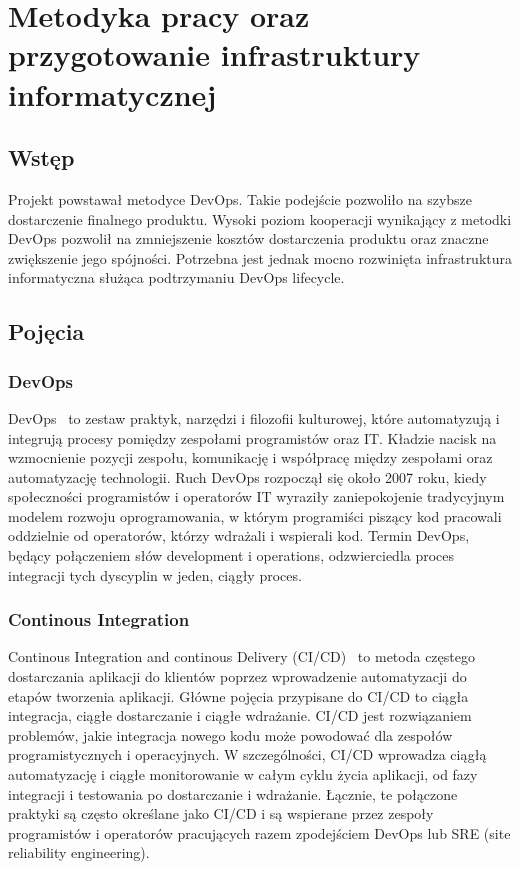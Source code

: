 
\chapter{Metodyka pracy oraz przygotowanie infrastruktury informatycznej}

\section{Wstęp}
Projekt powstawał metodyce DevOps. Takie podejście pozwoliło na szybsze dostarczenie finalnego produktu. Wysoki poziom kooperacji wynikający z metodki DevOps pozwolił na zmniejszenie kosztów dostarczenia produktu oraz znaczne zwiększenie jego spójności. Potrzebna jest jednak mocno rozwinięta infrastruktura informatyczna służąca podtrzymaniu DevOps lifecycle.

\section{Pojęcia}
	\subsection{DevOps}
	DevOps~\cite{devops} to zestaw praktyk, narzędzi i filozofii kulturowej, które automatyzują i integrują procesy pomiędzy zespołami programistów oraz IT. Kładzie nacisk na wzmocnienie pozycji zespołu, komunikację i współpracę między zespołami oraz automatyzację technologii.
	Ruch DevOps rozpoczął się około 2007 roku, kiedy społeczności programistów i operatorów IT wyraziły zaniepokojenie tradycyjnym modelem rozwoju oprogramowania, w którym programiści piszący kod pracowali oddzielnie od operatorów, którzy wdrażali i wspierali kod. Termin DevOps, będący połączeniem słów development i operations, odzwierciedla proces integracji tych dyscyplin w jeden, ciągły proces.
	\subsection{Continous Integration}
	Continous Integration and continous Delivery (CI/CD)~\cite{ci} to metoda częstego dostarczania aplikacji do klientów poprzez wprowadzenie automatyzacji do etapów tworzenia aplikacji. Główne pojęcia przypisane do CI/CD to ciągła integracja, ciągłe dostarczanie i ciągłe wdrażanie. CI/CD jest rozwiązaniem problemów, jakie integracja nowego kodu może powodować dla zespołów programistycznych i operacyjnych.
	W szczególności, CI/CD wprowadza ciągłą automatyzację i ciągłe monitorowanie w całym cyklu życia aplikacji, od fazy integracji i testowania po dostarczanie i wdrażanie. Łącznie, te połączone praktyki są często określane jako CI/CD i są wspierane przez zespoły programistów i operatorów pracujących razem zpodejściem DevOps lub SRE (site reliability engineering).
